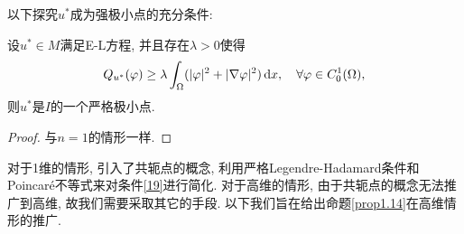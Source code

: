 以下探究$u^*$成为强极小点的充分条件:

\begin{proposition}[充分条件1]
    设$u^* \in M$满足E-L方程, 并且存在$\lambda > 0$使得 
    \begin{equation}\label{19}
        Q_{u^*}(\varphi) \geq \lambda\int_{\Omega}(|\varphi|^2 + |\nabla\varphi|^2) \,{\rm d}x, \quad \forall \varphi \in C_0^1(\Omega),
    \end{equation}
    则$u^*$是$I$的一个严格极小点.
    \begin{proof}
        与$n = 1$的情形一样.
    \end{proof}
\end{proposition}

对于1维的情形, 引入了共轭点的概念, 利用严格Legendre-Hadamard条件和Poincaré不等式来对条件\eqref{19}进行简化.
对于高维的情形, 由于共轭点的概念无法推广到高维, 故我们需要采取其它的手段. 以下我们旨在给出命题\ref{prop1.14}在高维情形的推广.

